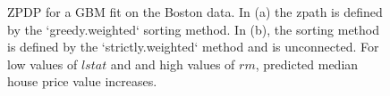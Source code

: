\begin{figure}

{\centering {}

}

\caption{ZPDP for a GBM fit on the Boston data. In (a) the zpath is defined by the `greedy.weighted` sorting method. In (b), the sorting method is defined by the `strictly.weighted` method and is unconnected. For low values of $lstat$ and and high values of $rm$, predicted median house price value increases.}\label{fig:zpdpGBM}
\end{figure}

